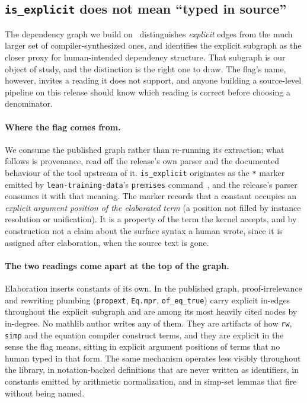 
\subsection{\texttt{is\_explicit} does not mean ``typed in source''}
\label{sec:is-explicit}

The dependency graph we build on~\citep{li2026network} distinguishes \emph{explicit} edges from the
much larger set of compiler-synthesized ones, and identifies the explicit
subgraph as the closer proxy for human-intended dependency structure. That
subgraph is our object of study, and the distinction is the right one to draw.
The flag's name, however, invites a reading it does not support, and anyone
building a source-level pipeline on this release should know which reading is
correct before choosing a denominator.

\paragraph{Where the flag comes from.}
We consume the published graph rather than re-running its extraction; what
follows is provenance, read off the release's own parser and the documented
behaviour of the tool upstream of it. \texttt{is\_explicit} originates as the
\texttt{*} marker emitted by \texttt{lean-training-data}'s \texttt{premises}
command~\citep{leantrainingdata}, and the release's parser consumes it with that
meaning. The marker records that a constant occupies an \emph{explicit argument
position of the elaborated term} (a position not filled by instance
resolution or unification). It is a property of the term the kernel accepts, and
by construction not a claim about the surface syntax a human wrote, since it is
assigned after elaboration, when the source text is gone.

\paragraph{The two readings come apart at the top of the graph.}
Elaboration inserts constants of its own. In the published graph,
proof-irrelevance and rewriting plumbing (\texttt{propext}, \texttt{Eq.mpr},
\texttt{of\_eq\_true}) carry explicit in-edges throughout the explicit
subgraph and are among its most heavily cited nodes by in-degree. No mathlib
author writes any of them. They are artifacts of how \texttt{rw}, \texttt{simp}
and the equation compiler construct terms, and they are explicit in the sense
the flag means, sitting in explicit argument positions of terms that no human
typed in that form. The same mechanism operates less visibly throughout
the library, in notation-backed definitions that are never written as
identifiers, in constants emitted by arithmetic normalization, and in simp-set
lemmas that fire without being named.

